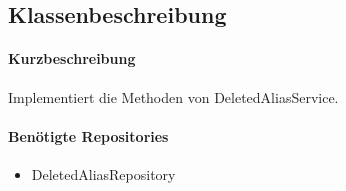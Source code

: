 \subsection*{Klassenbeschreibung}%
\paragraph*{Kurzbeschreibung}
Implementiert die Methoden von DeletedAliasService.
\paragraph*{Benötigte Repositories}
\begin{itemize}
    \item DeletedAliasRepository
\end{itemize}